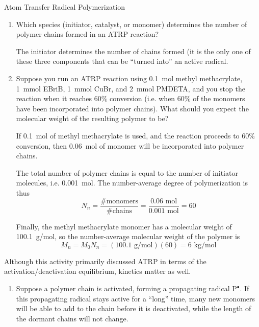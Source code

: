 \begin{activity}{Atom Transfer Radical Polymerization}
\begin{exercises}
\begin{enumerate}
			\item Which species (initiator, catalyst, or monomer) determines the number of polymer chains formed in an ATRP reaction?
		
		\begin{solution}{}
			The initiator determines the number of chains formed (it is the only one of these three components that can be ``turned into'' an active radical.
		\end{solution}
	
			\item Suppose you run an ATRP reaction using 0.1~mol methyl methacrylate, 1~mmol EBriB, 1~mmol CuBr, and 2~mmol PMDETA, and you stop the reaction when it reaches 60\% conversion (i.e. when 60\% of the monomers have been incorporated into polymer chains).  What should you expect the molecular weight of the resulting polymer to be?
		
		\begin{solution}{}
			If 0.1~mol of methyl methacrylate is used, and the reaction proceeds to 60\% conversion, then 0.06~mol of monomer will be incorporated into polymer chains.
			
			The total number of polymer chains is equal to the number of initiator molecules, i.e. 0.001~mol.  The number-average degree of polymerization is thus
			\begin{equation*}
				N_n = \frac{\text{\# monomers}}{\text{\# chains}} = \frac{0.06\text{ mol}}{0.001\text{ mol}} = 60
			\end{equation*}
			
			Finally, the methyl methacrylate monomer has a molecular weight of 100.1~g/mol, so the number-average molecular weight of the polymer is
			\begin{equation*}
				M_n = M_0 N_n = (100.1\text{ g/mol})(60) = 6\text{ kg/mol}
			\end{equation*}
		\end{solution}
			
		\end{enumerate}
		
	\exercise Although this activity primarily discussed ATRP in terms of the activation/deactivation equilibrium, kinetics matter as well. \label{\labelbase:exc:kinetics}
	
		\begin{enumerate}
			\item Suppose a polymer chain is activated, forming a propagating radical P$^\bullet$.  If this propagating radical stays active for a ``long'' time, many new monomers will be able to add to the chain before it is deactivated, while the length of the dormant chains will not change.
			

\end{enumerate}
\end{exercises}
\end{activity}
